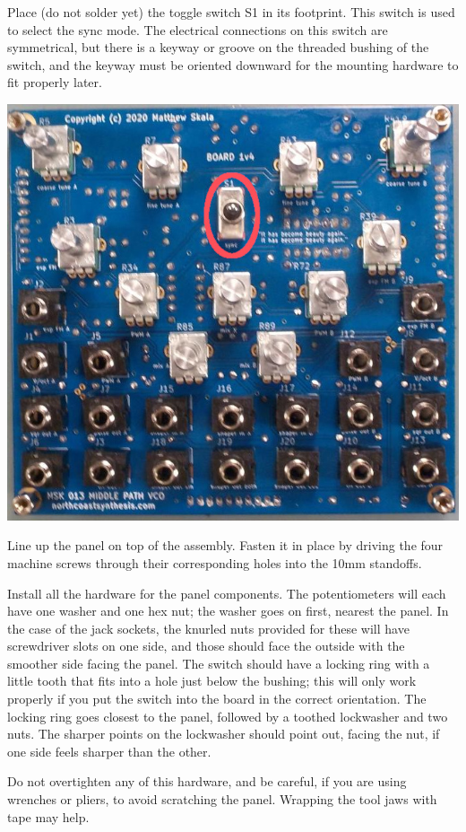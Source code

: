 Place (do not solder yet) the toggle switch S1 in its footprint.  This
switch is used to select the sync mode.  The electrical connections on this
switch are symmetrical, but there is a keyway or groove on the threaded
bushing of the switch, and the keyway must be oriented downward for the
mounting hardware to fit properly later.

\nopagebreak
\noindent\includegraphics[width=\linewidth]{spdt.jpg}

Line up the panel on top of the assembly.  Fasten it in place by driving
the four machine screws through their corresponding holes into the 10mm
standoffs.

Install all the hardware for the panel components.  The potentiometers will
each have one washer and one hex nut; the washer goes on first,
nearest the panel.  In the case of the jack sockets, the knurled nuts
provided for these will have screwdriver slots on one side, and those should
face the outside with the smoother side facing the panel.  The switch should
have a locking ring with a little tooth that fits into a hole just below the
bushing; this will only work properly if you put the switch into the board
in the correct orientation.  The locking ring goes closest to the panel,
followed by a toothed lockwasher and two nuts.  The sharper points on the
lockwasher should point out, facing the nut, if one side feels sharper than
the other.

Do not overtighten any of this hardware, and be careful, if you are
using wrenches or pliers, to avoid scratching the panel.  Wrapping the tool
jaws with tape may help.

